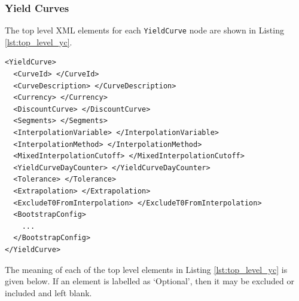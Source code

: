 \subsubsection{Yield Curves}

The top level XML elements for each \lstinline!YieldCurve! node are shown in Listing \ref{lst:top_level_yc}.

\begin{listing}[H]
\begin{verbatim}
<YieldCurve>
  <CurveId> </CurveId>
  <CurveDescription> </CurveDescription>
  <Currency> </Currency>
  <DiscountCurve> </DiscountCurve>
  <Segments> </Segments>
  <InterpolationVariable> </InterpolationVariable>
  <InterpolationMethod> </InterpolationMethod>
  <MixedInterpolationCutoff> </MixedInterpolationCutoff>
  <YieldCurveDayCounter> </YieldCurveDayCounter>
  <Tolerance> </Tolerance>
  <Extrapolation> </Extrapolation>
  <ExcludeT0FromInterpolation> </ExcludeT0FromInterpolation>
  <BootstrapConfig>
    ...
  </BootstrapConfig>
</YieldCurve>
\end{verbatim}
\caption{Top level yield curve node}
\label{lst:top_level_yc}
\end{listing}

The meaning of each of the top level elements in Listing \ref{lst:top_level_yc} is given below. If an element is labelled
as `Optional', then it may be excluded or included and left blank.

